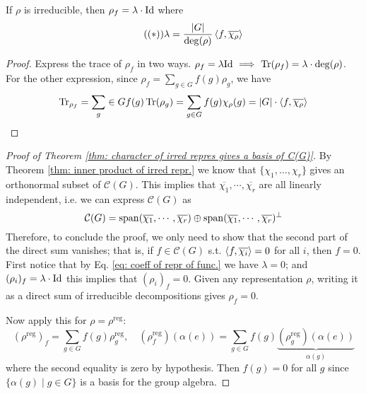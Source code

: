 \begin{proposition}
    If $\rho$ is irreducible, then $\rho_f = \lambda \cdot \mathrm{Id}$ where
    \begin{equation}\label{eq: coeff of repr of func.}\tag{$(\ast)$}
        \lambda = \frac{\left|G\right|}{\deg(\rho)} \left\langle f, \overline{\chi_{\rho}} \right\rangle
    \end{equation}
\end{proposition}

\begin{proof}
    Express the trace of $\rho_f$ in two ways. $\rho_f = \lambda \mathrm{Id} \ \Longrightarrow\  \operatorname{Tr}(\rho_f) = \lambda \cdot \deg(\rho)$. For the other expression, since $\rho_f = \sum_{g \in G} f(g) \rho_g$, we have
    \[
        \operatorname{Tr}_{\rho_f} = \sum_g \in G f(g) \operatorname{Tr}(\rho_g) = \sum_{g \in G} f(g) \chi_{\rho}(g) = \left|G\right| \cdot \left\langle f, \overline{\chi_{\rho}} \right\rangle
    \]
\end{proof}

\begin{proof}[Proof of Theorem \ref{thm: character of irred repres gives a basis of C(G)}]
    By Theorem \ref{thm: inner product of irred repr.} we know that $\{\chi_1, \dots, \chi_r\}$ gives an orthonormal subset of $\mathcal{C}(G)$. This implies that $\overline{\chi_{1}}, \cdots, \overline{\chi_{r}}$ are all linearly independent, i.e. we can express $\mathcal{C}(G)$ as
    \[
        \mathcal{C}(G) = \operatorname{span}(\overline{\chi_{1}}, \cdots, \overline{\chi_{r}}) \oplus \operatorname{span}(\overline{\chi_{1}}, \cdots, \overline{\chi_{r}})^{\perp}
    \]
    Therefore, to conclude the proof, we only need to show that the second part of the direct sum vanishes; that is, if $f \in \mathcal{C}(G)$ s.t. $\left\langle f, \overline{\chi_i} \right\rangle = 0$ for all $i$, then $f = 0$. First notice that by Eq. \eqref{eq: coeff of repr of func.} we have $\lambda = 0$; and $(\rho_i)_f = \lambda \cdot \mathrm{Id}$ this implies that $(\rho_i)_f = 0$. Given any representation $\rho$, writing it as a direct sum of irreducible decompositions gives $\rho_f = 0$.

    Now apply this for $\rho = \rho^{\text{reg}}$:
    \[
        (\rho^{\text{reg}})_f = \sum_{g \in G} f(g) \rho^{\text{reg}}_g, \quad (\rho^{\text{reg}}_f) (\alpha(e)) = \sum_{g \in G} f(g) \underbrace{(\rho^{\text{reg}}_g) (\alpha(e))}_{\alpha(g)}
    \]
    where the second equality is zero by hypothesis. Then $f(g) = 0$ for all $g$ since $\{\alpha(g) \mid g \in G\}$ is a basis for the group algebra.
\end{proof}

